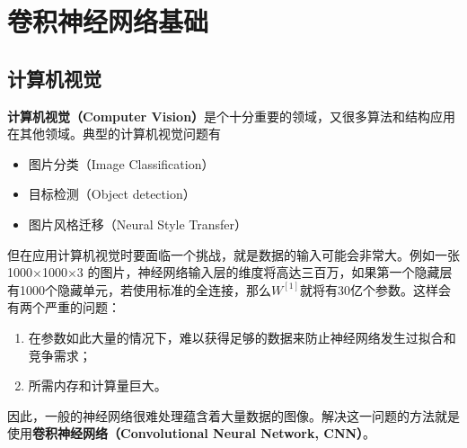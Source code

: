 \documentclass[../../main.tex]{subfiles}
\begin{document}
\chapter{卷积神经网络基础}

\section{计算机视觉}
\textbf{计算机视觉（Computer Vision）}是个十分重要的领域，又很多算法和结构应用在其他领域。典型的计算机视觉问题有
\begin{itemize}
    \item 图片分类（Image Classification）
    \item 目标检测（Object detection）
    \item 图片风格迁移（Neural Style Transfer）
\end{itemize}

但在应用计算机视觉时要面临一个挑战，就是数据的输入可能会非常大。例如一张 1000×1000×3 的图片，神经网络输入层的维度将高达三百万，如果第一个隐藏层有1000个隐藏单元，若使用标准的全连接，那么\(W^{[1]}\)就将有30亿个参数。这样会有两个严重的问题：
\begin{enumerate}
    \item 在参数如此大量的情况下，难以获得足够的数据来防止神经网络发生过拟合和竞争需求；
    \item 所需内存和计算量巨大。
\end{enumerate}
因此，一般的神经网络很难处理蕴含着大量数据的图像。解决这一问题的方法就是使用\textbf{卷积神经网络（Convolutional Neural Network, CNN）}。
\end{document}
